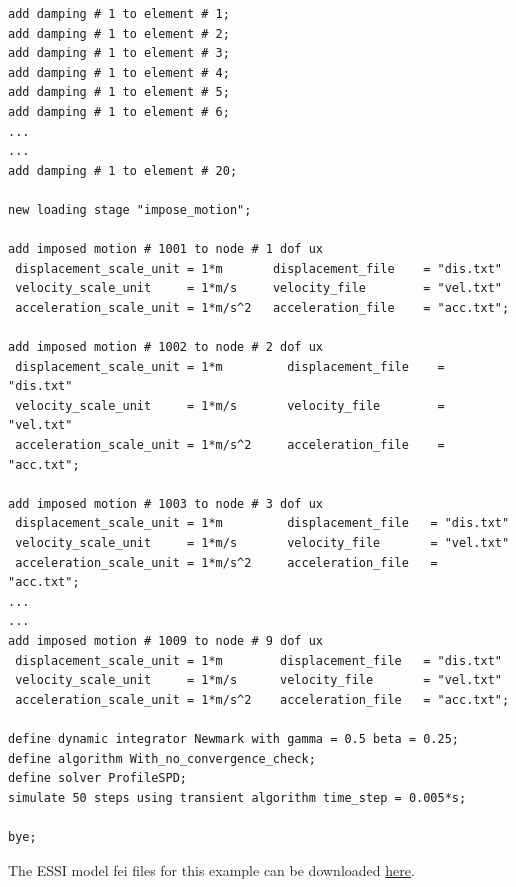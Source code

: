 \documentclass[fleqn,11pt]{article}
\begin{document}
\begin{lstlisting}
add damping # 1 to element # 1;
add damping # 1 to element # 2;
add damping # 1 to element # 3;
add damping # 1 to element # 4;
add damping # 1 to element # 5;
add damping # 1 to element # 6;
...
...
add damping # 1 to element # 20;

new loading stage "impose_motion";

add imposed motion # 1001 to node # 1 dof ux 
 displacement_scale_unit = 1*m       displacement_file    = "dis.txt" 
 velocity_scale_unit     = 1*m/s     velocity_file        = "vel.txt" 
 acceleration_scale_unit = 1*m/s^2   acceleration_file    = "acc.txt";

add imposed motion # 1002 to node # 2 dof ux 
 displacement_scale_unit = 1*m         displacement_file    = "dis.txt" 
 velocity_scale_unit     = 1*m/s       velocity_file        = "vel.txt" 
 acceleration_scale_unit = 1*m/s^2     acceleration_file    = "acc.txt";

add imposed motion # 1003 to node # 3 dof ux 
 displacement_scale_unit = 1*m         displacement_file   = "dis.txt" 
 velocity_scale_unit     = 1*m/s       velocity_file       = "vel.txt" 
 acceleration_scale_unit = 1*m/s^2     acceleration_file   = "acc.txt";
...
...
add imposed motion # 1009 to node # 9 dof ux 
 displacement_scale_unit = 1*m        displacement_file   = "dis.txt" 
 velocity_scale_unit     = 1*m/s      velocity_file       = "vel.txt" 
 acceleration_scale_unit = 1*m/s^2    acceleration_file   = "acc.txt";

define dynamic integrator Newmark with gamma = 0.5 beta = 0.25;
define algorithm With_no_convergence_check;
define solver ProfileSPD;
simulate 50 steps using transient algorithm time_step = 0.005*s;
         
bye;
\end{lstlisting}


The ESSI model fei files for this example can be downloaded 
\href{https://github.com/BorisJeremic/Real-ESSI-Examples/blob/master/model_fei_file/27NodeBrick_dynamic_impose_motion/27NodeBrick_dynamic_impose_motion.tgz?raw=true}{here}.











\end{document}
